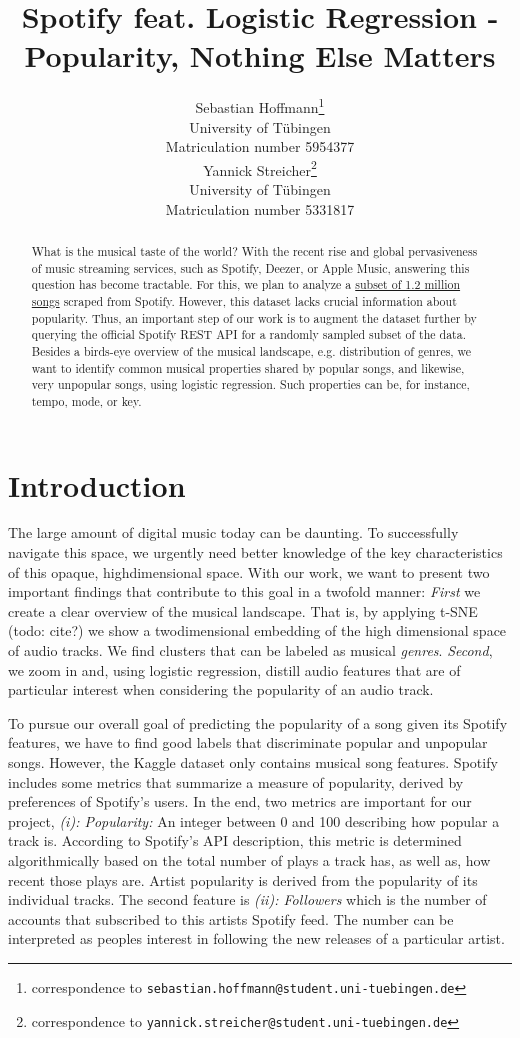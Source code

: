 \documentclass{article}
\title{Spotify feat. Logistic Regression - \\ Popularity, Nothing Else Matters}
\author{%
  Sebastian Hoffmann\thanks{correspondence to \texttt{sebastian.hoffmann@student.uni-tuebingen.de}}\\
  University of Tübingen\\
  Matriculation number 5954377\\
  \And
  Yannick Streicher\thanks{correspondence to \texttt{yannick.streicher@student.uni-tuebingen.de}}\\
  University of Tübingen\\
  Matriculation number 5331817\\
}
\newcommand{\todo}[1]{{\color{red}todo: #1}}
\begin{document}
\maketitle

\begin{abstract}
  What is the musical taste of the world? With the recent rise and global pervasiveness of music streaming services, such as Spotify, Deezer, or Apple Music, answering this question has become tractable. For this, we plan to analyze a \href{https://www.kaggle.com/rodolfofigueroa/spotify-12m-songs}{subset of 1.2 million songs} scraped from Spotify. However, this dataset lacks crucial information about popularity. Thus, an important step of our work is to augment the dataset further by querying the official Spotify REST API for a randomly sampled subset of the data. Besides a birds-eye overview of the musical landscape, e.g. distribution of genres, we want to identify common musical properties shared by popular songs, and likewise, very unpopular songs, using logistic regression. Such properties can be, for instance, tempo, mode, or key.
\end{abstract}

\section{Introduction}
The large amount of digital music today can be daunting. To successfully navigate this space, we urgently need better knowledge of the key characteristics of this opaque, highdimensional space. With our work, we want to present two important findings that contribute to this goal in a twofold manner: \textit{First} we create a clear overview of the musical landscape. That is, by applying t-SNE (\todo{cite?}) we show a twodimensional embedding of the high dimensional space of audio tracks. We find clusters that can be labeled as musical \textit{genres}. \textit{Second}, we zoom in and, using logistic regression, distill audio features that are of particular interest when considering the popularity of an audio track.

To pursue our overall goal of predicting the popularity of a song given its Spotify features, we have to find good labels that discriminate popular and unpopular songs. However, the Kaggle dataset only contains musical song features. Spotify includes some metrics that summarize a measure of popularity, derived by preferences of Spotify's users. In the end, two metrics are important for our project, \textit{(i): Popularity:} An integer between 0 and 100 describing how popular a track is. According to Spotify's API description, this metric is determined algorithmically based on the total number of plays a track has, as well as, how recent those plays are. Artist popularity is derived from the popularity of its individual tracks. The second feature is \textit{(ii): Followers} which is the number of accounts that subscribed to this artists Spotify feed. The number can be interpreted as peoples interest in following the new releases of a particular artist.
\end{document}
